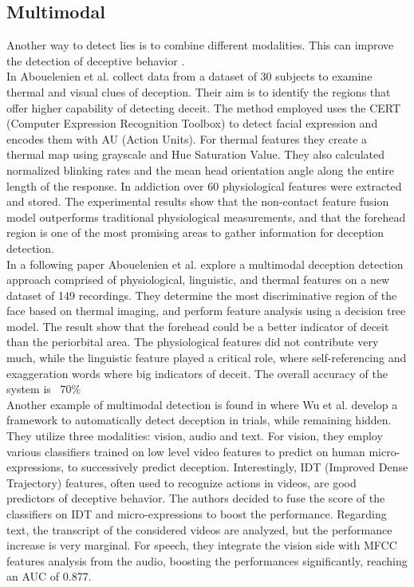 \subsection*{Multimodal}
Another way to detect lies is to combine different modalities. This can improve the detection of deceptive behavior \cite{Abouelenien:2014:DDU:2663204.2663229}. \\
In \cite{Abouelenien:2016:ATV:2910674.2910682} Abouelenien et al. collect data from a dataset of 30 subjects to examine thermal and visual clues of deception. Their aim is to identify the regions that offer higher capability of detecting deceit. The method employed uses the CERT (Computer Expression Recognition Toolbox) to detect facial expression and encodes them with AU (Action Units). For thermal features they create a thermal map using grayscale and Hue Saturation Value. They also calculated normalized blinking rates and the mean head orientation angle along the entire length of the response. In addiction over 60 physiological features were extracted and stored. The experimental results show that the non-contact feature fusion model outperforms traditional physiological measurements, and that the forehead region is one of the most promising areas to gather information for deception detection.\\
In a following paper \cite{7782429} Abouelenien et al. explore a multimodal deception detection approach comprised of physiological, linguistic, and thermal features on a new dataset of 149 recordings. They determine the most discriminative region of the face based on thermal imaging, and perform feature analysis using a decision tree model. The result show that the forehead could be a better indicator of deceit than the periorbital area. The physiological features did not contribute very much, while the linguistic feature played a critical role, where self-referencing and exaggeration words where big indicators of deceit. The overall accuracy of the system is ~70\%\\
Another example of multimodal detection is found in \cite{DBLP:journals/corr/abs-1712-04415} where Wu et al. develop a framework to automatically detect deception in trials, while remaining hidden. They utilize three modalities: vision, audio and text. For vision, they employ various classifiers trained on low level video features to predict on human micro-expressions, to successively predict deception. Interestingly, IDT (Improved Dense Trajectory) features, often used to recognize actions in videos, are good predictors of deceptive behavior. The authors decided to fuse the score of the classifiers on IDT and micro-expressions to boost the performance. Regarding text, the transcript of the considered videos are analyzed, but the performance increase is very marginal. For speech, they integrate the vision side with MFCC features analysis from the audio, boosting the performances significantly, reaching an AUC of 0.877. \\

